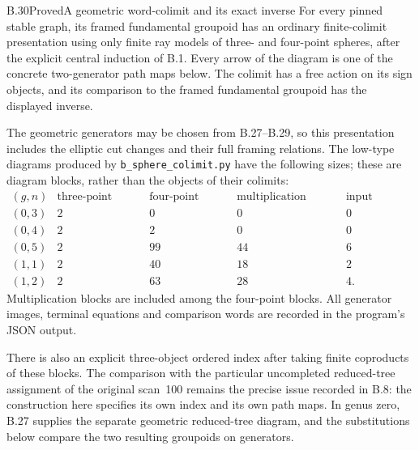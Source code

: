 \begin{result}{B.30}{Proved}{A geometric word-colimit and its exact inverse}
For every pinned stable graph, its framed fundamental groupoid
has an ordinary finite-colimit presentation using only finite
ray models of three- and four-point spheres, after the explicit
central induction of B.1.  Every arrow of the diagram is one of
the concrete two-generator path maps below.  The colimit has a
free action on its sign objects, and its comparison to the
framed fundamental groupoid has the displayed inverse.

The geometric generators may be chosen from B.27--B.29, so
this presentation includes the elliptic cut changes and their
full framing relations.  The low-type diagrams produced by
\texttt{b\_sphere\_colimit.py} have the following sizes; these
are diagram blocks, rather than the objects of their colimits:
\[
\begin{array}{c|rrrr}
(g,n)&\text{three-point blocks}&\text{four-point blocks}
 &\text{multiplication blocks}&\text{input relators}\\\hline
(0,3)&2&0&0&0\\
(0,4)&2&2&0&0\\
(0,5)&2&99&44&6\\
(1,1)&2&40&18&2\\
(1,2)&2&63&28&4 .
\end{array}                                                     \tag{B.98}
\]
Multiplication blocks are included among the four-point blocks.
All generator images, terminal equations and comparison words
are recorded in the program's JSON output.

There is also an explicit three-object ordered index after
taking finite coproducts of these blocks.  The comparison with
the particular uncompleted reduced-tree assignment of the
original scan~100 remains the precise issue recorded in B.8:
the construction here specifies its own index and its own path
maps.  In genus zero, B.27 supplies the separate geometric
reduced-tree diagram, and the substitutions below compare the
two resulting groupoids on generators.
\end{result}
